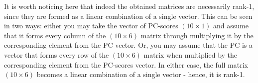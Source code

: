 \documentclass[10pt,twocolumn]{article}
\begin{document}

It is worth noticing here that indeed the obtained matrices are necessarily rank-1, since they are formed as a linear combination of a single vector. This can be seen in two ways: either you may take the vector of PC-scores $(10 \times 1)$ and assume that it forms every column of the $(10 \times 6)$ matrix through multiplying it by the corresponding element from the PC vector. Or, you may assume that the PC is a vector that forms every row of the $(10 \times 6)$ matrix when multiplied by the corresponding element from the PC-scores vector. In either case, the full matrix $(10 \times 6)$ becomes a linear combination of a single vector - hence, it is rank-1.
\end{document}
